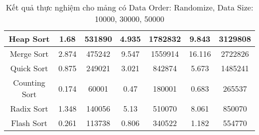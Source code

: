 \begin{table}[H]
{\begin{tabular}{|ccccccc|}
\multicolumn{1}{|c|}{Heap Sort} & \multicolumn{1}{c|}{1.68} & \multicolumn{1}{c|}{531890} & \multicolumn{1}{c|}{4.935} & \multicolumn{1}{c|}{1782832} & \multicolumn{1}{c|}{9.843} & \multicolumn{1}{c|}{3129808} \\ \hline
\multicolumn{1}{|c|}{Merge Sort} & \multicolumn{1}{c|}{2.874} & \multicolumn{1}{c|}{475242} & \multicolumn{1}{c|}{9.547} & \multicolumn{1}{c|}{1559914} & \multicolumn{1}{c|}{16.116} & \multicolumn{1}{c|}{2722826} \\ \hline
\multicolumn{1}{|c|}{Quick Sort} & \multicolumn{1}{c|}{0.875} & \multicolumn{1}{c|}{249021} & \multicolumn{1}{c|}{3.021} & \multicolumn{1}{c|}{842874} & \multicolumn{1}{c|}{5.673} & \multicolumn{1}{c|}{1485241} \\ \hline
\multicolumn{1}{|c|}{Counting Sort} & \multicolumn{1}{c|}{0.174} & \multicolumn{1}{c|}{60001} & \multicolumn{1}{c|}{0.47} & \multicolumn{1}{c|}{180001} & \multicolumn{1}{c|}{0.683} & \multicolumn{1}{c|}{265537} \\ \hline
\multicolumn{1}{|c|}{Radix Sort} & \multicolumn{1}{c|}{1.348} & \multicolumn{1}{c|}{140056} & \multicolumn{1}{c|}{5.13} & \multicolumn{1}{c|}{510070} & \multicolumn{1}{c|}{8.061} & \multicolumn{1}{c|}{850070} \\ \hline
\multicolumn{1}{|c|}{Flash Sort} & \multicolumn{1}{c|}{0.261} & \multicolumn{1}{c|}{113738} & \multicolumn{1}{c|}{0.806} & \multicolumn{1}{c|}{340522} & \multicolumn{1}{c|}{1.182} & \multicolumn{1}{c|}{554770} \\ \hline
\end{tabular}%
}
\caption{Kết quả thực nghiệm cho mảng có Data Order: Randomize, Data Size: 10000, 30000, 50000}
\label{tab:randomize_10000_30000_50000}
\end{table}

